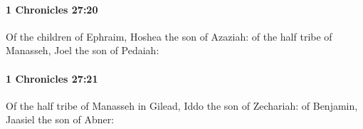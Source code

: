 		\paragraph{1 Chronicles 27:20} %
			\label{1CHRONICLES-27-20}

			Of the children of Ephraim, Hoshea the son of Azaziah: of the half tribe of Manasseh, Joel the son of Pedaiah:


		\paragraph{1 Chronicles 27:21} %
			\label{1CHRONICLES-27-21}

			Of the half tribe of Manasseh in Gilead, Iddo the son of Zechariah: of Benjamin, Jaasiel the son of Abner:


